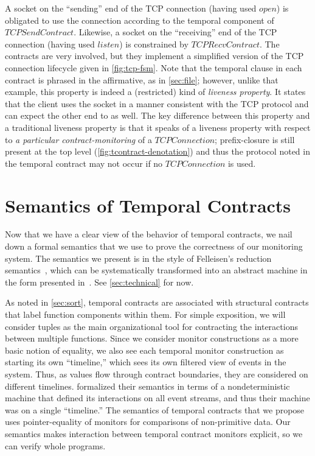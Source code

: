 A socket on the ``sending'' end of the TCP connection (having used $open$) is obligated to use the connection according to the temporal component of $TCPSendContract$.
%
Likewise, a socket on the ``receiving'' end of the TCP connection (having used $listen$) is constrained by $TCPRecvContract$.
%
The contracts are very involved, but they implement a simplified version of the TCP connection lifecycle given in \autoref{fig:tcp-fsm}.
%
Note that the temporal clause in each contract is phrased in the affirmative, as in \autoref{sec:file}; however, unlike that example, this property is indeed a (restricted) kind of \emph{liveness property}.
%
It states that the client uses the socket in a manner consistent with the TCP protocol and can expect the other end to as well.
%
The key difference between this property and a traditional liveness property is that it speaks of a liveness property with respect to \emph{a particular contract-monitoring} of a $TCPConnection$; prefix-closure is still present at the top level (\autoref{fig:tcontract-denotation}) and thus the protocol noted in the temporal contract may not occur if no $TCPConnection$ is used.

\section{Semantics of Temporal Contracts} \label{sec:temporal-semantics}

Now that we have a clear view of the behavior of temporal contracts, we nail down a formal semantics that we use to prove the correctness of our monitoring system.
%
The semantics we present is in the style of Felleisen's reduction semantics~\citep{ianjohnson:Felleisen:2009:SEP:1795772}, which can be systematically transformed into an abstract machine in the form presented in~\citet{dvanhorn:VanHorn2010Abstracting}.
%
See \autoref{sec:technical} for now.

As noted in \autoref{sec:sort}, temporal contracts are associated with structural contracts that label function components within them.
%
For simple exposition, we will consider tuples as the main organizational tool for contracting the interactions between multiple functions.
%
Since we consider monitor constructions as a more basic notion of equality, we also see each temporal monitor construction as starting its own ``timeline,'' which sees its own filtered view of events in the system.
%
Thus, as values flow through contract boundaries, they are considered on different timelines.
%
\citeauthor{ianjohnson:dfm:icfp2011} formalized their semantics in terms of a nondeterministic machine that defined its interactions on all event streams, and thus their machine was on a single ``timeline.''
%
The semantics of temporal contracts that we propose uses pointer-equality of monitors for comparisons of non-primitive data.
%
Our semantics makes interaction between temporal contract monitors explicit, so we can verify whole programs.

